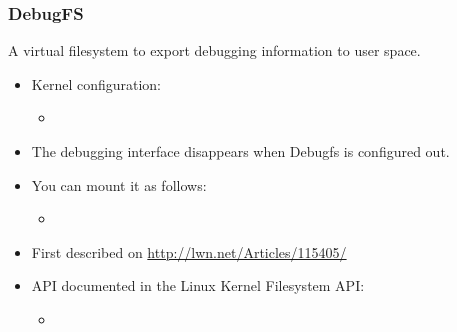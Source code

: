 \begin{frame}
  \frametitle{DebugFS}
  A virtual filesystem to export debugging information to user space.
  \begin{itemize}
  \item Kernel configuration: 
    \begin{itemize}
    \item {}
    \end{itemize}
  \item The debugging interface disappears when Debugfs is
    configured out.
  \item You can mount it as follows:
    \begin{itemize}
    \item {}
    \end{itemize}
  \item First described on \url{http://lwn.net/Articles/115405/}
  \item API documented in the Linux Kernel Filesystem API:
    \begin{itemize}
    \item {}
    \end{itemize}
  \end{itemize}
\end{frame}

